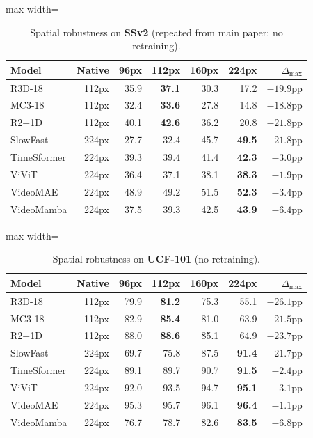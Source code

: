 \documentclass[runningheads]{llncs}
\newcommand{\tabtight}{\setlength{\tabcolsep}{3.5pt}\renewcommand{\arraystretch}{1.12}}
\begin{document}
\begin{table}[!htbp]
\centering
\caption{Spatial robustness on \textbf{SSv2} (repeated from main paper; no retraining).}
\label{tab:sup_sp_ssv2}
\scriptsize\tabtight
\begin{adjustbox}{max width=\textwidth}
\begin{tabular}{l r rrrr r}
\toprule
Model & Native & 96px & 112px & 160px & 224px & $\Delta_\text{max}$ \\
\midrule
R3D-18      & 112px & 35.9 & \textbf{37.1} & 30.3 & 17.2 & $-19.9$pp \\
MC3-18      & 112px & 32.4 & \textbf{33.6} & 27.8 & 14.8 & $-18.8$pp \\
R2+1D       & 112px & 40.1 & \textbf{42.6} & 36.2 & 20.8 & $-21.8$pp \\
SlowFast    & 224px & 27.7 & 32.4 & 45.7 & \textbf{49.5} & $-21.8$pp \\
\midrule
TimeSformer & 224px & 39.3 & 39.4 & 41.4 & \textbf{42.3} & $-3.0$pp \\
ViViT       & 224px & 36.4 & 37.1 & 38.1 & \textbf{38.3} & $-1.9$pp \\
VideoMAE    & 224px & 48.9 & 49.2 & 51.5 & \textbf{52.3} & $-3.4$pp \\
VideoMamba  & 224px & 37.5 & 39.3 & 42.5 & \textbf{43.9} & $-6.4$pp \\
\bottomrule
\end{tabular}
\end{adjustbox}
\end{table}

\begin{table}[!htbp]
\centering
\caption{Spatial robustness on \textbf{UCF-101} (no retraining).}
\label{tab:sup_sp_ucf}
\scriptsize\tabtight
\begin{adjustbox}{max width=\textwidth}
\begin{tabular}{l r rrrr r}
\toprule
Model & Native & 96px & 112px & 160px & 224px & $\Delta_\text{max}$ \\
\midrule
R3D-18      & 112px & 79.9 & \textbf{81.2} & 75.3 & 55.1 & $-26.1$pp \\
MC3-18      & 112px & 82.9 & \textbf{85.4} & 81.0 & 63.9 & $-21.5$pp \\
R2+1D       & 112px & 88.0 & \textbf{88.6} & 85.1 & 64.9 & $-23.7$pp \\
SlowFast    & 224px & 69.7 & 75.8 & 87.5 & \textbf{91.4} & $-21.7$pp \\
\midrule
TimeSformer & 224px & 89.1 & 89.7 & 90.7 & \textbf{91.5} & $-2.4$pp \\
ViViT       & 224px & 92.0 & 93.5 & 94.7 & \textbf{95.1} & $-3.1$pp \\
VideoMAE    & 224px & 95.3 & 95.7 & 96.1 & \textbf{96.4} & $-1.1$pp \\
VideoMamba  & 224px & 76.7 & 78.7 & 82.6 & \textbf{83.5} & $-6.8$pp \\
\bottomrule
\end{tabular}
\end{adjustbox}
\end{table}
\end{document}
